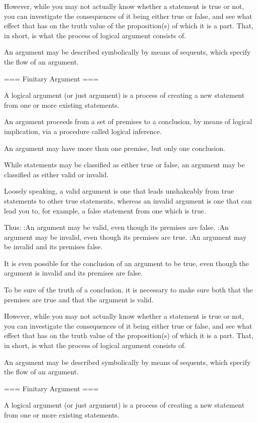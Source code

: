 However, while you may not actually know whether a statement is true or not, you can investigate the consequences of it being either true or false, and see what effect that has on the truth value of the proposition(s) of which it is a part. That, in short, is what the process of logical argument consists of.


An argument may be described symbolically by means of sequents, which specify the flow of an argument.


=== Finitary Argument ===

A logical argument (or just argument) is a process of creating a new statement from one or more existing statements.

An argument proceeds from a set of premises to a conclusion, by means of logical implication, via a procedure called logical inference.


An argument may have more than one premise, but only one conclusion.


While statements may be classified as either true or false, an argument may be classified as either valid or invalid.


Loosely speaking, a valid argument is one that leads unshakeably from true statements to other true statements, whereas an invalid argument is one that can lead you to, for example, a false statement from one which is true.


Thus:
:An argument may be valid, even though its premises are false.
:An argument may be invalid, even though its premises are true.
:An argument may be invalid and its premises false.

It is even possible for the conclusion of an argument to be true, even though the argument is invalid and its premises are false.


To be sure of the truth of a conclusion, it is necessary to make sure both that the premises are true and that the argument is valid.


However, while you may not actually know whether a statement is true or not, you can investigate the consequences of it being either true or false, and see what effect that has on the truth value of the proposition(s) of which it is a part. That, in short, is what the process of logical argument consists of.


An argument may be described symbolically by means of sequents, which specify the flow of an argument.


=== Finitary Argument ===

A logical argument (or just argument) is a process of creating a new statement from one or more existing statements.

